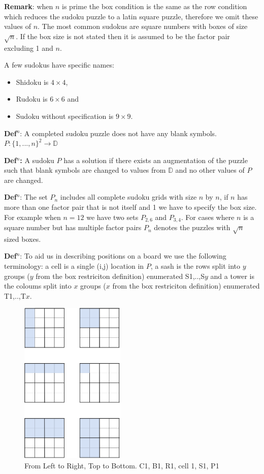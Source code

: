 \documentclass[a4paper,11pt]{report}
\newcounter{row}
\newcounter{col}
\begin{document}
\textbf{Remark}: when $n$ is prime the box condition is the same as the row condition which reduces the sudoku puzzle to a latin square puzzle, therefore we omit these values of $n$. The most common sudokus are square numbers with boxes of size $\sqrt{n}$. If the box size is not stated then it is assumed to be the factor pair excluding 1 and $n$.

A few sudokus have specific names:
\begin{itemize}
\item Shidoku is $4\times 4$,
\item Rudoku is $6\times 6$ and
\item Sudoku without specification is $9\times 9$.
\end{itemize} 

\textbf{Def$^n$}: A completed sudoku puzzle does not have any blank symbols. $P:  \{1,...,n\}^2\rightarrow\mathbb D$ 

\textbf{Def$^n$:} A sudoku $P$ has a solution if there exists an augmentation of the puzzle such that blank symbols are changed to values from $\mathbb D$ and no other values of $P$ are changed.

\textbf{Def$^n$}: The set $P_n$ includes all complete sudoku grids with size $n$ by $n$, if $n$ has more than one factor pair that is not itself and 1 we have to specify the box size. For example when $n=12$ we have two sets $P_{2,6}$ and $P_{3,4}$. For cases where $n$ is a square number but has multiple factor pairs $P_n$ denotes the puzzles with $\sqrt{n}$ sized boxes.

\textbf{Def$^n$}: To aid us in describing positions on a board we use the following terminology: a cell is a single (i,j) location in $P$, a sash is the rows split into $y$ groups ($y$ from the box restriciton definition) enumerated S1,..,S$y$ and a tower is the coloums split into $x$ groups  ($x$ from the box restriciton definition) enumerated T1,..,T$x$.

\begin{figure}[h!]
	\begin{center}
		\includegraphics[width=50mm]{figures/highlighted_cells.png}
	\end{center}
	\caption{\label{fig:labels}From Left to Right, Top to Bottom. C1, B1, R1, cell 1, S1, P1 }
\end{figure}
\end{document}

